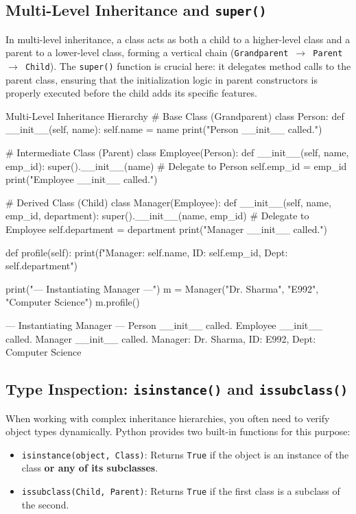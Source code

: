 \subsection{Multi-Level Inheritance and \texttt{super()}}
In multi-level inheritance, a class acts as both a child to a higher-level class and a parent to a lower-level class, forming a vertical chain (\texttt{Grandparent $\to$ Parent $\to$ Child}). The \texttt{super()} function is crucial here: it delegates method calls to the parent class, ensuring that the initialization logic in parent constructors is properly executed before the child adds its specific features.

\begin{pythoncode}{Multi-Level Inheritance Hierarchy}
# Base Class (Grandparent)
class Person:
    def __init__(self, name):
        self.name = name
        print("Person __init__ called.")

# Intermediate Class (Parent)
class Employee(Person):
    def __init__(self, name, emp_id):
        super().__init__(name) # Delegate to Person
        self.emp_id = emp_id
        print("Employee __init__ called.")

# Derived Class (Child)
class Manager(Employee):
    def __init__(self, name, emp_id, department):
        super().__init__(name, emp_id) # Delegate to Employee
        self.department = department
        print("Manager __init__ called.")
        
    def profile(self):
        print(f"Manager: {self.name}, ID: {self.emp_id}, Dept: {self.department}")

print("--- Instantiating Manager ---")
m = Manager("Dr. Sharma", "E992", "Computer Science")
m.profile()
\end{pythoncode}

\begin{outputbox}
--- Instantiating Manager ---
Person __init__ called.
Employee __init__ called.
Manager __init__ called.
Manager: Dr. Sharma, ID: E992, Dept: Computer Science
\end{outputbox}

\subsection{Type Inspection: \texttt{isinstance()} and \texttt{issubclass()}}
When working with complex inheritance hierarchies, you often need to verify object types dynamically. Python provides two built-in functions for this purpose:
\begin{itemize}
    \item \texttt{isinstance(object, Class)}: Returns \texttt{True} if the object is an instance of the class \textbf{or any of its subclasses}.
    \item \texttt{issubclass(Child, Parent)}: Returns \texttt{True} if the first class is a subclass of the second.
\end{itemize}

